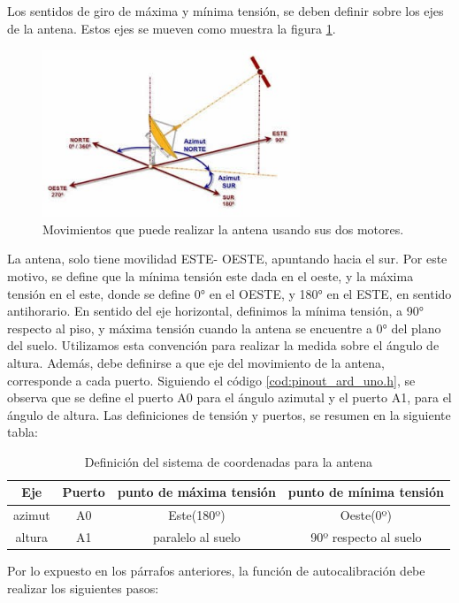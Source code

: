 Los sentidos de giro de máxima y mínima tensión, se deben definir sobre los ejes de la antena. Estos ejes se mueven como muestra la figura \ref{fig:mov_antena}. 

\begin{figure}[ht]
	\centering
	\includegraphics[height=5cm]{mov_antena}
	\caption{Movimientos que puede realizar la antena usando sus dos motores.}
	\label{fig:mov_antena}	
\end{figure}


La antena, solo tiene movilidad ESTE- OESTE, apuntando hacia el sur. Por este motivo, se define que la mínima tensión este dada en el oeste, y la máxima tensión en el este, donde se define 0° en el OESTE, y 180° en el ESTE, en sentido antihorario. En sentido del eje horizontal, definimos la mínima tensión, a 90° respecto al piso, y máxima tensión cuando la antena se encuentre a 0° del plano del suelo. Utilizamos esta convención para realizar la medida sobre el ángulo de altura. Además, debe definirse a que eje del movimiento de la antena, corresponde a cada puerto. Siguiendo el código \ref{cod:pinout_ard_uno.h}, se observa que se define el puerto A0 para el ángulo azimutal y el puerto A1, para el ángulo de altura. Las definiciones de tensión y puertos, se resumen en la siguiente tabla: 
\begin{table}[ht]
	\centering 
	\begin{tabular}{|c|c|c|c|}
		\hline
		Eje & Puerto & punto de máxima tensión & punto de mínima tensión\\ 
		\hline
		azimut &A0 & Este(180º) & Oeste(0º) 	 \\    
		\hline
		altura  &A1 &  paralelo al suelo& 90º respecto al suelo  \\
		\hline
	\end{tabular}
	\caption{Definición del sistema de coordenadas para la antena}
	\label{tab:def_sist_coord}
\end{table}

Por lo expuesto en los párrafos anteriores, la función de autocalibración debe realizar los siguientes pasos: 

